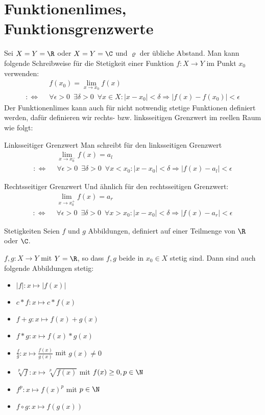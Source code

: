 \section{Funktionenlimes, Funktionsgrenzwerte}
Sei $X=Y=\R$ oder $X=Y=\C$ und $\varrho$ der übliche Abstand. Man kann folgende Schreibweise für die Stetigkeit einer Funktion $f:X\rightarrow Y$ im Punkt $x_0$ verwenden:
\begin{align*}
	&f(x_0)=\lim\limits_{x\to x_0}f(x)\\
	:\Longleftrightarrow\enspace&\forall\epsilon>0 \enspace\exists\delta>0 \enspace\forall x\in X:|x-x_0|<\delta \Rightarrow |f(x)-f(x_0)|<\epsilon
\end{align*}
Der Funktionenlimes kann auch für nicht notwendig stetige Funktionen definiert werden, dafür definieren wir rechts- bzw. linksseitigen Grenzwert im reellen Raum wie folgt:
\begin{definition}{Linksseitiger Grenzwert}
	Man schreibt für den linksseitigen Grenzwert
	\begin{align*}
		&\lim\limits_{x\to x_0^-}f(x)=a_l\\
		:\Longleftrightarrow\enspace&\forall\epsilon>0 \enspace\exists\delta>0 \enspace\forall x<x_0:|x-x_0|<\delta \Rightarrow |f(x)-a_l|<\epsilon
	\end{align*}
\end{definition}
\begin{definition}{Rechtsseitiger Grenzwert}
	Und ähnlich für den rechtsseitigen Grenzwert:
	\begin{align*}
		&\lim\limits_{x\to x_0^+}f(x)=a_r\\
		:\Longleftrightarrow\enspace&\forall\epsilon>0 \enspace\exists\delta>0 \enspace\forall x>x_0:|x-x_0|<\delta \Rightarrow |f(x)-a_r|<\epsilon
	\end{align*}
\end{definition}

\begin{satz}{Stetigkeiten}
	Seien $f$ und $g$ Abbildungen, definiert auf einer Teilmenge von $\R$ oder $\C$.

	$f,g:X\rightarrow Y$ mit $Y=\R$, so dass $f,g$ beide in $x_0\in X$ stetig sind. Dann sind auch folgende Abbildungen stetig:
	\begin{multicols}{2}
		\begin{itemize}
			\item $|f|:x\mapsto |f(x)|$
			\item $c*f:x\mapsto c*f(x)$
			\item $f+g:x\mapsto f(x)+g(x)$
			\item $f*g:x\mapsto f(x)*g(x)$
			\item $\displaystyle\frac{f}{g}:x\mapsto \frac{f(x)}{g(x)}$ mit $g(x)\neq 0$
			\item $\displaystyle\sqrt[p]{f}:x\mapsto \sqrt[p]{f(x)}$ mit $f(x)\geq 0, p\in\N$
			\item $\displaystyle f^p:x\mapsto f(x)^p$ mit $p\in\N$
			\item $f\circ g:x\mapsto f(g(x))$
		\end{itemize}
	\end{multicols}
\end{satz}
